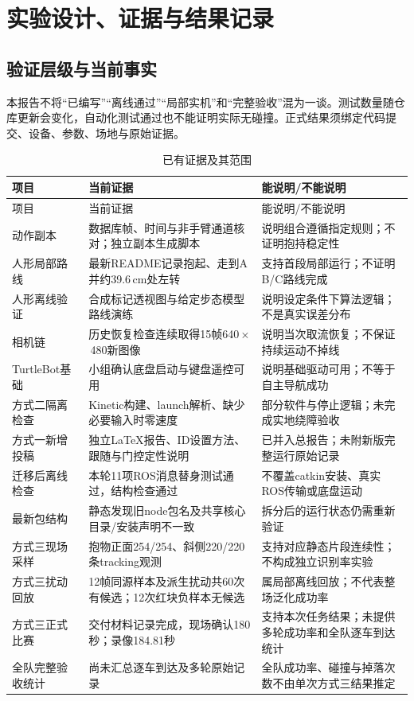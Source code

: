 \section{实验设计、证据与结果记录}\label{sec:experiments}
\subsection{验证层级与当前事实}
本报告不将“已编写”“离线通过”“局部实机”和“完整验收”混为一谈。测试数量随仓库更新会变化，自动化测试通过也不能证明实际无碰撞。正式结果须绑定代码提交、设备、参数、场地与原始证据。
\begin{longtable}{p{32mm}p{54mm}p{51mm}}
\caption{已有证据及其范围}\\\toprule
项目 & 当前证据 & 能说明/不能说明\\\midrule\endfirsthead
\toprule 项目 & 当前证据 & 能说明/不能说明\\\midrule\endhead
动作副本 & 数据库帧、时间与非手臂通道核对；独立副本生成脚本 & 说明组合遵循指定规则；不证明抱持稳定性\\
人形局部路线 & 最新README记录抱起、走到A并约39.6\,cm处左转 & 支持首段局部运行；不证明B/C路线完成\\
人形离线验证 & 合成标记透视图与给定步态模型路线演练 & 说明设定条件下算法逻辑；不是真实误差分布\\
相机链 & 历史恢复检查连续取得15帧640\,$\times$\,480新图像 & 说明当次取流恢复；不保证持续运动不掉线\\
TurtleBot基础 & 小组确认底盘启动与键盘遥控可用 & 说明基础驱动可用；不等于自主导航成功\\
方式二隔离检查 & Kinetic构建、launch解析、缺少必要输入时零速度 & 部分软件与停止逻辑；未完成实地绕障验收\\
方式一新增投稿 & 独立LaTeX报告、ID设置方法、跟随与门控定性说明 & 已并入总报告；未附新版完整运行原始记录\\
迁移后离线检查 & 本轮11项ROS消息替身测试通过，结构检查通过 & 不覆盖catkin安装、真实ROS传输或底盘运动\\
最新包结构 & 静态发现旧node包名及共享核心目录/安装声明不一致 & 拆分后的运行状态仍需重新验证\\
方式三现场采样 & 抱物正面254/254、斜侧220/220条tracking观测 & 支持对应静态片段连续性；不构成独立识别率实验\\
方式三扰动回放 & 12帧同源样本及派生扰动共60次有候选；12次红块负样本无候选 & 属局部离线回放；不代表整场泛化成功率\\
方式三正式比赛 & 交付材料记录完成，现场确认180秒；录像184.81秒 & 支持本次任务结果；未提供多轮成功率和全队逐车到达统计\\
全队完整验收统计 & 尚未汇总逐车到达及多轮原始记录 & 全队成功率、碰撞与掉落次数不由单次方式三结果推定\\\bottomrule
\end{longtable}

